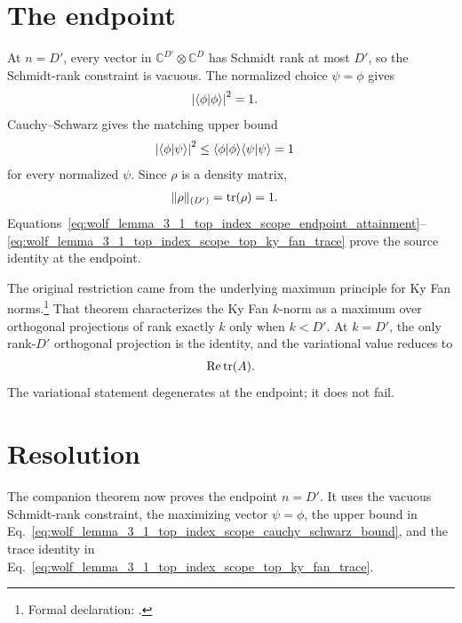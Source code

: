 \documentclass{article}
\begin{document}
\section{The endpoint}

At $n=D'$, every vector in
$\mathbb C^{D'}\otimes\mathbb C^D$ has Schmidt rank at most $D'$, so the
Schmidt-rank constraint is vacuous. The normalized choice $\psi=\phi$ gives
\begin{align}
    \left|\langle \phi | \phi \rangle\right|^2
        &=1.
    \label{eq:wolf_lemma_3_1_top_index_scope_endpoint_attainment}
\end{align}
Cauchy--Schwarz gives the matching upper bound
\begin{align}
    \left|\langle \phi | \psi \rangle\right|^2
        &\leq
        \langle \phi | \phi \rangle\langle \psi | \psi \rangle
        =1
    \label{eq:wolf_lemma_3_1_top_index_scope_cauchy_schwarz_bound}
\end{align}
for every normalized $\psi$. Since $\rho$ is a density matrix,
\begin{align}
    \|\rho\|_{(D')}
        &=\operatorname{tr}(\rho)
        =1.
    \label{eq:wolf_lemma_3_1_top_index_scope_top_ky_fan_trace}
\end{align}
Equations~\ref{eq:wolf_lemma_3_1_top_index_scope_endpoint_attainment}--%
\ref{eq:wolf_lemma_3_1_top_index_scope_top_ky_fan_trace} prove the source
identity at the endpoint.

The original restriction came from the underlying maximum principle for Ky
Fan norms.\footnote{Formal declaration:
    .}
That theorem characterizes the Ky Fan $k$-norm as a maximum over orthogonal
projections of rank exactly $k$ only when $k<D'$. At $k=D'$, the only
rank-$D'$ orthogonal projection is the identity, and the variational value
reduces to
\begin{align}
    \operatorname{Re}\operatorname{tr}(A).
    \label{eq:wolf_lemma_3_1_top_index_scope_top_projection_value}
\end{align}
The variational statement degenerates at the endpoint; it does not fail.

\section{Resolution}

The companion theorem
 now proves the endpoint
$n=D'$. It uses the vacuous Schmidt-rank constraint, the maximizing vector
$\psi=\phi$, the upper bound in
Eq.~\ref{eq:wolf_lemma_3_1_top_index_scope_cauchy_schwarz_bound}, and the
trace identity in
Eq.~\ref{eq:wolf_lemma_3_1_top_index_scope_top_ky_fan_trace}.
\end{document}

